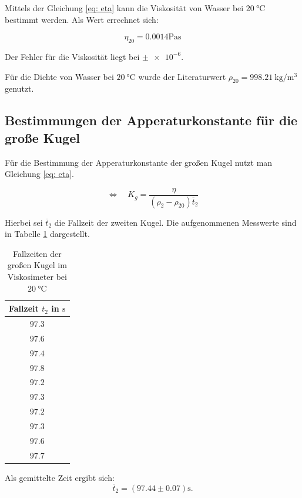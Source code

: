 Mittels der Gleichung \eqref{eq: eta} kann die Viskosität
von Wasser bei $\SI{20}{\degreeCelsius}$ bestimmt werden.
Als Wert errechnet sich:

\begin{equation}
\label{eq:viskosi_wasser}
\eta_{20}= \num{0.0014} \si{\pascal\second}
\end{equation}

Der Fehler für die Viskosität liegt bei $\pm\num{e-6}$.

Für die Dichte von Wasser bei $\SI{20}{\degreeCelsius}$ wurde der Literaturwert $\rho_{20}=\SI{998.21}{\kilogram\per\cubic\meter}$ 
genutzt\cite{lit_dichte}.

\subsection{Bestimmungen der Apperaturkonstante für die große Kugel}
Für die Bestimmung der Apperaturkonstante der großen Kugel nutzt man Gleichung \eqref{eq: eta}. 

\begin{equation*}
\Leftrightarrow \quad K_{g}=\frac{\eta}{\left(\rho_2-\rho_{20}\right)\overline{t}_2}
\end{equation*}

Hierbei sei $\overline{t}_2$ die Fallzeit der zweiten Kugel.
Die aufgenommenen Messwerte sind in Tabelle \ref{tab:messwerte_fallzeit_kugel_gross} dargestellt.

\begin{table}
\centering
\begin{tabular} {c}
  \toprule
  Fallzeit $t_2$ in $\si{\second}$ \\
  \midrule
  $\num{97.3}$ \\
  $\num{97.6}$ \\
  $\num{97.4}$ \\
  $\num{97.8}$ \\
  $\num{97.2}$ \\
  $\num{97.3}$ \\
  $\num{97.2}$ \\
  $\num{97.3}$ \\
  $\num{97.6}$ \\
  $\num{97.7}$ \\
\bottomrule
\end{tabular}
\caption{Fallzeiten der großen Kugel im Viskosimeter bei $\SI{20}{\degreeCelsius}$}
\label{tab:messwerte_fallzeit_kugel_gross}
\end{table}

Als gemittelte Zeit ergibt sich:
\begin{equation}
\label{eq:gemittelte_fallzeit_gross}
\overline{t}_{2}=\left(\num{97.44}\pm\num{0.07}\right) \si{\second}.
\end{equation}

